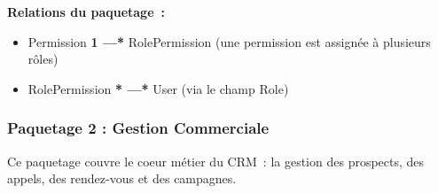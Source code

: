 \textbf{Relations du paquetage~:}
\begin{itemize}
    \item Permission \textbf{1 ---* } RolePermission (une permission est assignée à plusieurs rôles)
    \item RolePermission \textbf{* ---* } User (via le champ Role)
\end{itemize}

\subsubsection{Paquetage 2 : Gestion Commerciale}

Ce paquetage couvre le coeur métier du CRM~: la gestion des prospects, des appels,
des rendez-vous et des campagnes.

